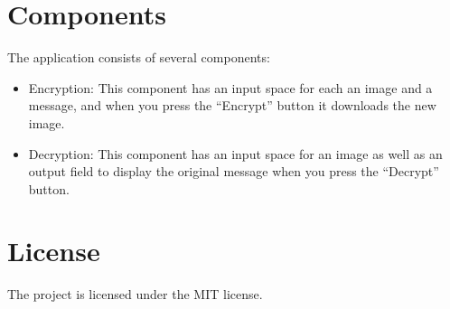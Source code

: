 \documentclass[conference]{IEEEtran}
\begin{document}
\section{Components}
The application consists of several components:
\begin{itemize}
\item Encryption: This component has an input space for each an image and a message, and when you press the “Encrypt” button it downloads the new image.
\item Decryption: This component has an input space for an image as well as an output field to display the original message when you press the “Decrypt” button.
\end{itemize}


\section{License}
The project is licensed under the MIT license.




\end{document}

